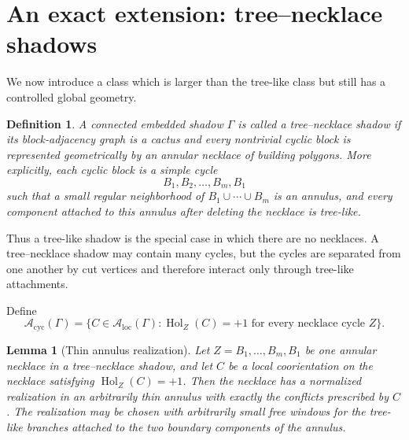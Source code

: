 \documentclass[11pt]{article}
\newtheorem{definition}[theorem]{Definition}
\newtheorem{lemma}[theorem]{Lemma}
\newcommand{\A}{\mathcal A}
\newcommand{\Hol}{\operatorname{Hol}}
\newcommand{\loc}{\mathrm{loc}}
\newcommand{\cyc}{\mathrm{cyc}}
\begin{document}
\section{An exact extension: tree--necklace shadows}

We now introduce a class which is larger than the tree-like class but still has a controlled global geometry.

\begin{definition}\label{def:necklace}
A connected embedded shadow $\Gamma$ is called a \emph{tree--necklace shadow} if its block-adjacency graph is a cactus and every nontrivial cyclic block is represented geometrically by an annular necklace of building polygons.  More explicitly, each cyclic block is a simple cycle
\[
 B_1,B_2,\ldots,B_m,B_1
\]
such that a small regular neighborhood of $B_1\cup\cdots\cup B_m$ is an annulus, and every component attached to this annulus after deleting the necklace is tree-like.
\end{definition}

Thus a tree-like shadow is the special case in which there are no necklaces.  A tree--necklace shadow may contain many cycles, but the cycles are separated from one another by cut vertices and therefore interact only through tree-like attachments.



Define
\[
 \A_{\cyc}(\Gamma)=\{C\in\A_{\loc}(\Gamma):\Hol_Z(C)=+1
 \text{ for every necklace cycle }Z\}.
\]

\begin{lemma}[Thin annulus realization]
\label{lem:thinannulus}
Let $Z=B_1,\ldots,B_m,B_1$ be one annular necklace in a tree--necklace shadow, and let $C$ be a local coorientation on the necklace satisfying $\Hol_Z(C)=+1$.  Then the necklace has a normalized realization in an arbitrarily thin annulus with exactly the conflicts prescribed by $C$.  The realization may be chosen with arbitrarily small free windows for the tree-like branches attached to the two boundary components of the annulus.
\end{lemma}
\end{document}

